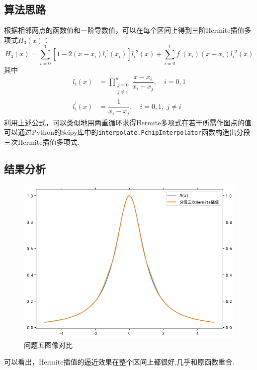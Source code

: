 \documentclass[UTF8,ctexart,a4paper,11pt,openany]{article}
\theoremstyle{definition}
\begin{document}
    \subsection{算法思路}
    根据相邻两点的函数值和一阶导数值，可以在每个区间上得到三阶Hermite插值多项式$H_3(x)$：
    \[
        H_3(x)=\sum_{i=0}^1[1-2(x-x_i){l_i}^{'}(x_i)]{l_i}^2(x)+\sum_{i=0}^1 f^{'}(x_i)(x-x_i){l_i}^2(x)
    \]
    其中
    \begin{align*}
        l_i(x)&=\prod_{\substack{j=0\\j\neq i}}^n \dfrac{x-x_i}{x_i-x_j},\quad i=0,1\\
        l_i^{'}(x)&=\dfrac{1}{x_i-x_j},\quad i=0,1,\;j\neq i 
    \end{align*}
    利用上述公式，可以类似地用两重循环求得Hermite多项式在若干所需作图点的值.\\ \indent
    可以通过Python的Scipy库中的\texttt{interpolate.PchipInterpolator}函数构造出分段三次Hermite插值多项式.
    \subsection{结果分析}%
    \begin{figure}[H]
        \centering
        \includegraphics{pics/P3.5.png}
        \caption{问题五图像对比}
        \label{graph:1}
        \end{figure}
    可以看出，Hermite插值的逼近效果在整个区间上都很好,几乎和原函数重合.
\end{document}
